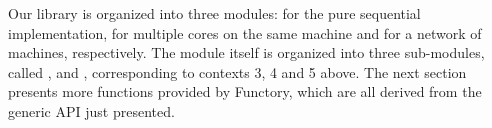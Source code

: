 \documentclass[a4paper,12pt]{article}
\newcommand{\functory}{\textsf{Functory}}
\begin{document}
Our library is organized into three modules:  for the
pure sequential implementation,  for multiple cores on the
same machine and  for a network of machines, respectively.
The  module itself is organized into three sub-modules,
called ,  and ,
corresponding to contexts 3, 4 and 5 above. 
The next section presents more functions provided by \functory, which
are all derived from the generic API just presented.

\end{document}
